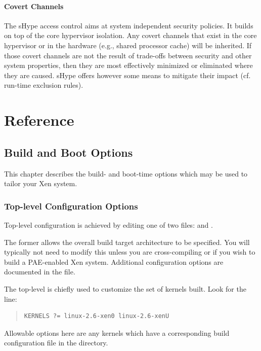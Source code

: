 \documentclass[11pt,twoside,final,openright]{report}
\begin{document}
\subsection{Covert Channels}

The sHype access control aims at system independent security policies.
It builds on top of the core hypervisor isolation. Any covert channels
that exist in the core hypervisor or in the hardware (e.g., shared
processor cache) will be inherited. If those covert channels are not
the result of trade-offs between security and other system properties,
then they are most effectively minimized or eliminated where they are
caused. sHype offers however some means to mitigate their impact
(cf. run-time exclusion rules).

\part{Reference}

\chapter{Build and Boot Options} 

This chapter describes the build- and boot-time options which may be
used to tailor your Xen system.

\section{Top-level Configuration Options} 

Top-level configuration is achieved by editing one of two 
files:  and . 

The former allows the overall build target architecture to be 
specified. You will typically not need to modify this unless 
you are cross-compiling or if you wish to build a PAE-enabled 
Xen system. Additional configuration options are documented 
in the  file. 

The top-level  is chiefly used to customize the set of
kernels built. Look for the line: 
\begin{quote}
\begin{verbatim}
KERNELS ?= linux-2.6-xen0 linux-2.6-xenU
\end{verbatim}
\end{quote}

Allowable options here are any kernels which have a corresponding 
build configuration file in the  directory. 
\end{document}
